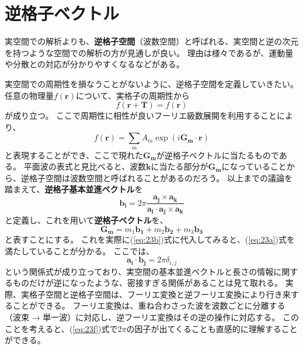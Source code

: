 \documentclass[a4paper]{jsreport}
\begin{document}
        \section{逆格子ベクトル}
            実空間での解析よりも、\textbf{逆格子空間}（波数空間）と呼ばれる、実空間と逆の次元を持つような空間での解析の方が見通しが良い。
            理由は様々であるが、運動量や分散との対応が分かりやすくなるなどがある。\par
            実空間での周期性を損なうことがないように、逆格子空間を定義していきたい。
            任意の物理量$f(\boldsymbol{r})$について、実格子の周期性から
            \begin{equation} \label{eq:23a}
                f(\boldsymbol{r} + \boldsymbol{T}) = f(\boldsymbol{r}) 
            \end{equation}
            が成り立つ。
            ここで周期性に相性が良いフーリエ級数展開を利用することにより、
            \begin{equation} \label{eq:23b}
                f(\boldsymbol{r}) = \sum_{m} A_m \exp(i\boldsymbol{G_m} \cdot \boldsymbol{r})
            \end{equation}
            と表現することができ、ここで現れた$\boldsymbol{G_m}$が逆格子ベクトルに当たるものである。
            平面波の表式と見比べると、波数$\boldsymbol{k}$に当たる部分が$\boldsymbol{G_m}$になっていることから、逆格子空間は波数空間と呼ばれることがあるのだろう。
            以上までの議論を踏まえて、\textbf{逆格子基本並進ベクトル}を
            \begin{equation}
                \boldsymbol{b_i} = 2 \pi \frac{\boldsymbol{a_j} \times \boldsymbol{a_k}}{\boldsymbol{a_i} \cdot \boldsymbol{a_j} \times \boldsymbol{a_k}}
            \end{equation}
            と定義し、これを用いて\textbf{逆格子ベクトル}を、
            \begin{equation}
                \boldsymbol{G_m} = m_1 \boldsymbol{b_1} + m_2 \boldsymbol{b_2} + m_3 \boldsymbol{b_3} 
            \end{equation}
            と表すことにする。
            これを実際に(\ref{eq:23b})式に代入してみると、(\ref{eq:23a})式を満たしていることが分かる。
            ここでは、
            \begin{equation} \label{eq:23f}
                \boldsymbol{a_i} \cdot \boldsymbol{b_j} = 2 \pi \delta_{i,j}
            \end{equation}
            という関係式が成り立っており、実空間の基本並進ベクトルと長さの情報に関するものだけが逆になったような、密接すぎる関係があることは見て取れる。
            実際、実格子空間と逆格子空間は、フーリエ変換と逆フーリエ変換により行き来することができる。
            フーリエ変換は、重ね合わさった波を波数ごとに分離する（波束 → 単一波）に対応し、逆フーリエ変換はその逆の操作に対応する。
            このことを考えると、(\ref{eq:23f})式で$2\pi$の因子が出てくることも直感的に理解することができる。
\end{document}
